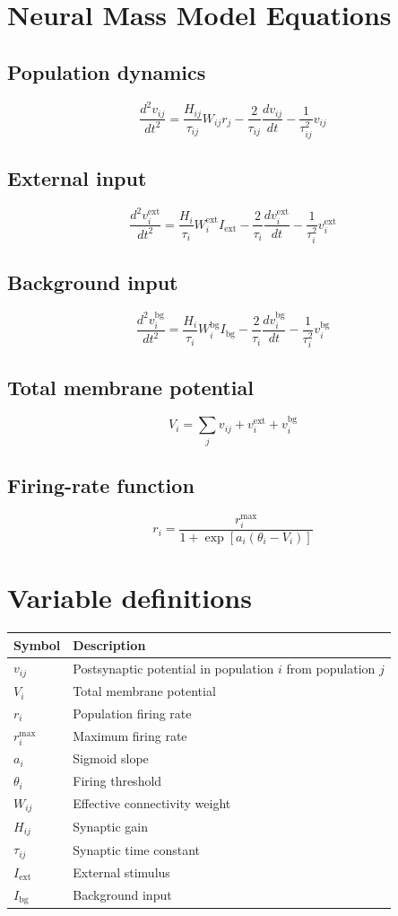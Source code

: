 \documentclass{article}
\begin{document}
\section*{Neural Mass Model Equations}

\subsection*{Population dynamics}
\[
\frac{d^2 v_{ij}}{dt^2}
=
\frac{H_{ij}}{\tau_{ij}}W_{ij}r_j
-\frac{2}{\tau_{ij}}\frac{dv_{ij}}{dt}
-\frac{1}{\tau_{ij}^2}v_{ij}
\]

\subsection*{External input}
\[
\frac{d^2 v_i^{\mathrm{ext}}}{dt^2}
=
\frac{H_i}{\tau_i}W_i^{\mathrm{ext}}I_{\mathrm{ext}}
-\frac{2}{\tau_i}\frac{dv_i^{\mathrm{ext}}}{dt}
-\frac{1}{\tau_i^2}v_i^{\mathrm{ext}}
\]

\subsection*{Background input}
\[
\frac{d^2 v_i^{\mathrm{bg}}}{dt^2}
=
\frac{H_i}{\tau_i}W_i^{\mathrm{bg}}I_{\mathrm{bg}}
-\frac{2}{\tau_i}\frac{dv_i^{\mathrm{bg}}}{dt}
-\frac{1}{\tau_i^2}v_i^{\mathrm{bg}}
\]

\subsection*{Total membrane potential}
\[
V_i=\sum_j v_{ij}+v_i^{\mathrm{ext}}+v_i^{\mathrm{bg}}
\]

\subsection*{Firing-rate function}
\[
r_i=\frac{r_i^{\max}}
{1+\exp\left[a_i(\theta_i-V_i)\right]}
\]

\section*{Variable definitions}

\begin{tabular}{ll}
\toprule
Symbol & Description\\
\midrule
$v_{ij}$ & Postsynaptic potential in population $i$ from population $j$\\
$V_i$ & Total membrane potential\\
$r_i$ & Population firing rate\\
$r_i^{\max}$ & Maximum firing rate\\
$a_i$ & Sigmoid slope\\
$\theta_i$ & Firing threshold\\
$W_{ij}$ & Effective connectivity weight\\
$H_{ij}$ & Synaptic gain\\
$\tau_{ij}$ & Synaptic time constant\\
$I_{\mathrm{ext}}$ & External stimulus\\
$I_{\mathrm{bg}}$ & Background input\\
\bottomrule
\end{tabular}
\end{document}
